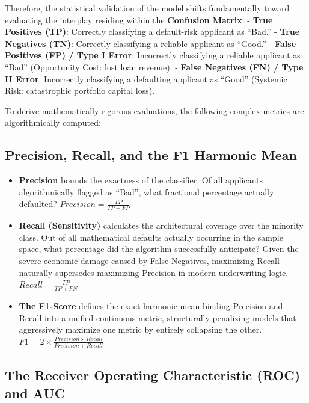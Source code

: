 Therefore, the statistical validation of the model shifts fundamentally
toward evaluating the interplay residing within the \textbf{Confusion
Matrix}: - \textbf{True Positives (TP)}: Correctly classifying a
default-risk applicant as ``Bad.'' - \textbf{True Negatives (TN)}:
Correctly classifying a reliable applicant as ``Good.'' - \textbf{False
Positives (FP) / Type I Error}: Incorrectly classifying a reliable
applicant as ``Bad'' (Opportunity Cost: lost loan revenue). -
\textbf{False Negatives (FN) / Type II Error}: Incorrectly classifying a
defaulting applicant as ``Good'' (Systemic Risk: catastrophic portfolio
capital loss).

To derive mathematically rigorous evaluations, the following complex
metrics are algorithmically computed:

\hypertarget{precision-recall-and-the-f1-harmonic-mean}{%
\subsection{Precision, Recall, and the F1 Harmonic
Mean}\label{precision-recall-and-the-f1-harmonic-mean}}

\begin{itemize}
\tightlist
\item
  \textbf{Precision} bounds the exactness of the classifier. Of all
  applicants algorithmically flagged as ``Bad'', what fractional
  percentage actually defaulted? \(Precision = \frac{TP}{TP + FP}\)
\item
  \textbf{Recall (Sensitivity)} calculates the architectural coverage
  over the minority class. Out of all mathematical defaults actually
  occurring in the sample space, what percentage did the algorithm
  successfully anticipate? Given the severe economic damage caused by
  False Negatives, maximizing Recall naturally supersedes maximizing
  Precision in modern underwriting logic.
  \(Recall = \frac{TP}{TP + FN}\)
\item
  \textbf{The F1-Score} defines the exact harmonic mean binding
  Precision and Recall into a unified continuous metric, structurally
  penalizing models that aggressively maximize one metric by entirely
  collapsing the other.
  \(F1 = 2 \times \frac{Precision \times Recall}{Precision + Recall}\)
\end{itemize}

\hypertarget{the-receiver-operating-characteristic-roc-and-auc}{%
\subsection{The Receiver Operating Characteristic (ROC) and
AUC}\label{the-receiver-operating-characteristic-roc-and-auc}}

